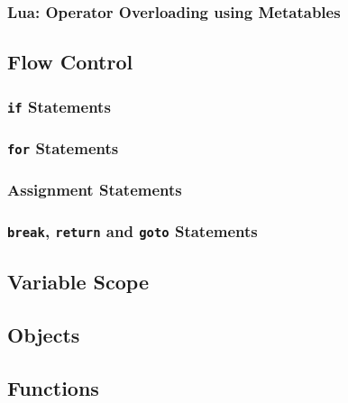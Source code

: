 \subsubsection{Lua: Operator Overloading using Metatables}

\subsection{Flow Control}
\subsubsection{\texttt{if} Statements}
\subsubsection{\texttt{for} Statements}
\subsubsection{Assignment Statements}
\subsubsection{\texttt{break}, \texttt{return} and \texttt{goto} Statements}

\subsection{Variable Scope}

\subsection{Objects}

\subsection{Functions}
